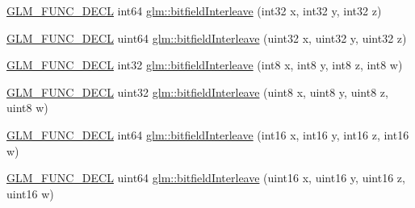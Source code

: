 \begin{DoxyCompactItemize}
\item 
\hyperlink{setup_8hpp_ab2d052de21a70539923e9bcbf6e83a51}{G\+L\+M\+\_\+\+F\+U\+N\+C\+\_\+\+D\+E\+CL} int64 \hyperlink{group__gtx__bit_ga64e2d84f6560af3cc639644b1e628c42}{glm\+::bitfield\+Interleave} (int32 x, int32 y, int32 z)
\item 
\hyperlink{setup_8hpp_ab2d052de21a70539923e9bcbf6e83a51}{G\+L\+M\+\_\+\+F\+U\+N\+C\+\_\+\+D\+E\+CL} uint64 \hyperlink{group__gtx__bit_ga7c10eb37f608365cfaef5ca2c476e1ce}{glm\+::bitfield\+Interleave} (uint32 x, uint32 y, uint32 z)
\item 
\hyperlink{setup_8hpp_ab2d052de21a70539923e9bcbf6e83a51}{G\+L\+M\+\_\+\+F\+U\+N\+C\+\_\+\+D\+E\+CL} int32 \hyperlink{group__gtx__bit_ga7da84ecc2b3a46c9c08a9f40012359cf}{glm\+::bitfield\+Interleave} (int8 x, int8 y, int8 z, int8 w)
\item 
\hyperlink{setup_8hpp_ab2d052de21a70539923e9bcbf6e83a51}{G\+L\+M\+\_\+\+F\+U\+N\+C\+\_\+\+D\+E\+CL} uint32 \hyperlink{group__gtx__bit_ga447c0bbed9d60c14578626d8f03f3755}{glm\+::bitfield\+Interleave} (uint8 x, uint8 y, uint8 z, uint8 w)
\item 
\hyperlink{setup_8hpp_ab2d052de21a70539923e9bcbf6e83a51}{G\+L\+M\+\_\+\+F\+U\+N\+C\+\_\+\+D\+E\+CL} int64 \hyperlink{group__gtx__bit_ga09ee0be0fac790a1607a711e597dd9bf}{glm\+::bitfield\+Interleave} (int16 x, int16 y, int16 z, int16 w)
\item 
\hyperlink{setup_8hpp_ab2d052de21a70539923e9bcbf6e83a51}{G\+L\+M\+\_\+\+F\+U\+N\+C\+\_\+\+D\+E\+CL} uint64 \hyperlink{group__gtx__bit_gac8a926a7bfd9b23c22a4f685193fbfe1}{glm\+::bitfield\+Interleave} (uint16 x, uint16 y, uint16 z, uint16 w)
\end{DoxyCompactItemize}

